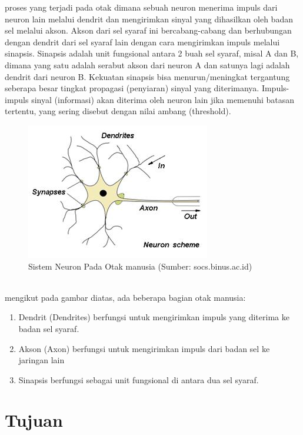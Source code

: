 \begin{enumerate}
    proses yang terjadi pada otak dimana sebuah neuron menerima impuls dari neuron lain melalui dendrit dan mengirimkan sinyal yang dihasilkan oleh badan sel melalui akson. Akson dari sel syaraf ini bercabang-cabang dan berhubungan dengan dendrit dari sel syaraf lain dengan cara mengirimkan impuls melalui sinapsis. Sinapsis adalah unit fungsional antara 2 buah sel syaraf, misal A dan B, dimana yang satu adalah serabut akson dari neuron A dan satunya lagi adalah dendrit dari neuron B. Kekuatan sinapsis bisa menurun/meningkat tergantung seberapa besar tingkat propagasi (penyiaran) sinyal yang diterimanya. Impuls-impuls sinyal (informasi) akan diterima oleh neuron lain jika memenuhi batasan tertentu, yang sering disebut dengan nilai ambang (threshold).
    \begin{figure} [ht] \centering
      \includegraphics[scale=0.9]{gambar/neuron.jpg}
      \caption{Sistem Neuron Pada Otak manusia (Sumber: socs.binus.ac.id)}
      \label{fig:MechineLearning}
    \end{figure}\\
    mengikut pada gambar diatas, ada beberapa bagian otak manusia:
    \begin{enumerate}[nolistsep]
      \item Dendrit (Dendrites) berfungsi untuk mengirimkan impuls yang diterima ke badan sel syaraf.
      \item Akson (Axon) berfungsi untuk mengirimkan impuls dari badan sel ke jaringan lain
      \item Sinapsis berfungsi sebagai unit fungsional di antara dua sel syaraf.
    \end{enumerate}
\end{enumerate}

\section{Tujuan}

